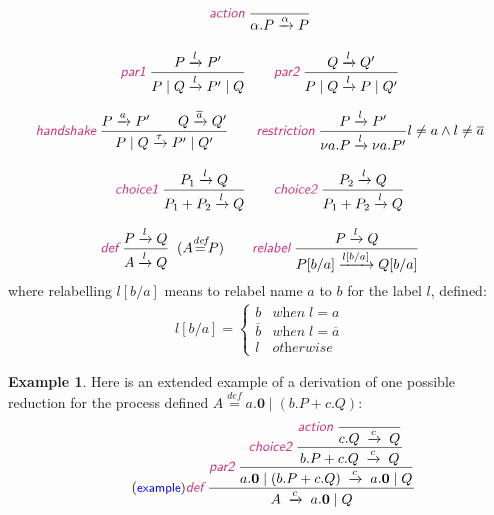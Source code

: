 \documentclass{article}
\newcommand{\exampleLabel}{\tag{\small{\textcolor{blue}{\textsf{example}}}}}
\theoremstyle{definition}
\newtheorem{example}{Example}
\newcommand{\trule}[1]{\textcolor{labelColor}{\textit{\textsf{#1}}}\;}
\begin{document}
\begin{mdframed}
\begin{center}
\begin{align*}
\begin{array}{c}
\trule{action}\dfrac{}{\alpha.P \xrightarrow{\alpha} P} \\[2em]
%
\trule{par1}{\dfrac{P \xrightarrow{l} P'}{P \mid Q \xrightarrow{l} P' \mid Q}}
\qquad
\trule{par2}{\dfrac{Q \xrightarrow{l} Q'}{P \mid Q \xrightarrow{l} P \mid Q'}} \\[2em]
\trule{handshake}\dfrac{P \xrightarrow{a} P' \qquad Q \xrightarrow{\overline{a}} Q'}
{P \mid Q \xrightarrow{\tau} P' \mid Q'}
\qquad
\trule{restriction}\dfrac{P \xrightarrow{l} P'}
{\nu a . P \xrightarrow{l} \nu a . P'} {l \neq a \wedge l \neq \overline{a}} \\[2em]
\trule{choice1}\dfrac{P_1 \xrightarrow{l} Q}{P_1 + P_2 \xrightarrow{l} Q}
\qquad
\trule{choice2}\dfrac{P_2 \xrightarrow{l} Q}{P_1 + P_2 \xrightarrow{l} Q} \\[2em]
\trule{def}
\dfrac{P \xrightarrow{l} Q}
      {A \xrightarrow{l} Q} \;\; (A {\mathrel{\mathop{=}\limits^{\textit{def}}}} P)
\qquad
\trule{relabel}
\dfrac{P \xrightarrow{l} Q}
      {P[b/a] \xrightarrow{l[b/a]} Q[b/a]}
\end{array} \\
\end{align*}
where relabelling $l[b/a]$ means to relabel name $a$ to $b$ for the label $l$, defined:
%
\begin{align*}
l[b/a] = \begin{cases}
b & \textit{when} \;l = a \\
\overline{b} & \textit{when} \; l = \overline{a} \\
l & \textit{otherwise}
\end{cases}
\end{align*}
\end{center}
\end{mdframed}

\begin{example}
  Here is an extended example of a
  derivation of one possible reduction for the process
defined $A \stackrel{\textit{def}}{=} a . \mathbf{0} \mid (b . P + c.Q)$:
%
\begin{align*}
  \exampleLabel{}
  \trule{def}
  \dfrac{
\trule{par2}
\dfrac{
\trule{choice2}
\dfrac{\trule{action}\dfrac{}{c . Q \; \xrightarrow{c} \; Q}}
{b . P + c.Q \; \xrightarrow{c} \; Q}}
{a . \mathbf{0} \mid (b . P + c.Q) \; \xrightarrow{c} \; a.\mathbf{0}
  \mid Q}
  }
  {A \; \xrightarrow{c} \; a.\mathbf{0} \mid Q}
\end{align*}
\end{example}
\end{document}
